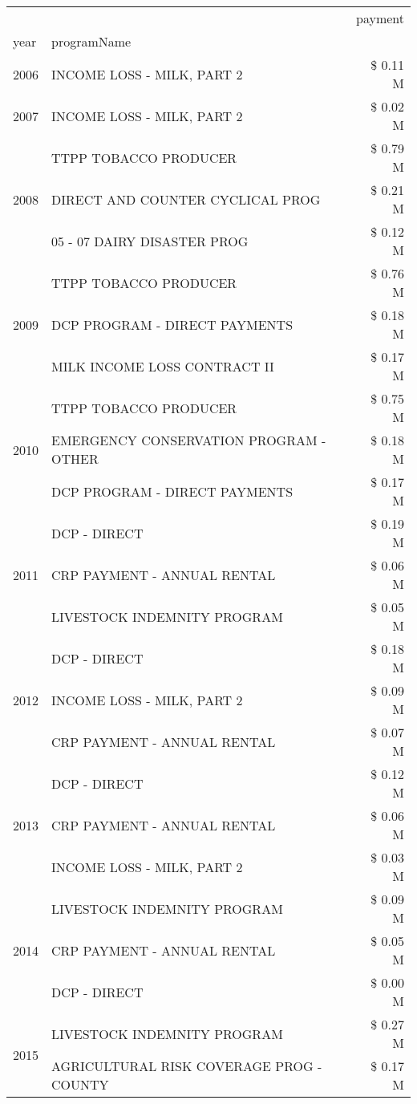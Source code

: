 \begin{tabular}{llr}
\toprule
 &  & payment \\
year & programName &  \\
\midrule
2006 & INCOME LOSS - MILK, PART 2 & \$ 0.11 M \\
\cline{1-3}
2007 & INCOME LOSS - MILK, PART 2 & \$ 0.02 M \\
\cline{1-3}
\multirow[t]{3}{*}{2008} & TTPP TOBACCO PRODUCER & \$ 0.79 M \\
 & DIRECT AND COUNTER CYCLICAL PROG & \$ 0.21 M \\
 & 05 - 07 DAIRY DISASTER PROG & \$ 0.12 M \\
\cline{1-3}
\multirow[t]{3}{*}{2009} & TTPP TOBACCO PRODUCER & \$ 0.76 M \\
 & DCP PROGRAM - DIRECT PAYMENTS & \$ 0.18 M \\
 & MILK INCOME LOSS CONTRACT II & \$ 0.17 M \\
\cline{1-3}
\multirow[t]{3}{*}{2010} & TTPP TOBACCO PRODUCER & \$ 0.75 M \\
 & EMERGENCY CONSERVATION PROGRAM - OTHER & \$ 0.18 M \\
 & DCP PROGRAM - DIRECT PAYMENTS & \$ 0.17 M \\
\cline{1-3}
\multirow[t]{3}{*}{2011} & DCP - DIRECT & \$ 0.19 M \\
 & CRP PAYMENT - ANNUAL RENTAL & \$ 0.06 M \\
 & LIVESTOCK INDEMNITY PROGRAM & \$ 0.05 M \\
\cline{1-3}
\multirow[t]{3}{*}{2012} & DCP - DIRECT & \$ 0.18 M \\
 & INCOME LOSS - MILK, PART 2 & \$ 0.09 M \\
 & CRP PAYMENT - ANNUAL RENTAL & \$ 0.07 M \\
\cline{1-3}
\multirow[t]{3}{*}{2013} & DCP - DIRECT & \$ 0.12 M \\
 & CRP PAYMENT - ANNUAL RENTAL & \$ 0.06 M \\
 & INCOME LOSS - MILK, PART 2 & \$ 0.03 M \\
\cline{1-3}
\multirow[t]{3}{*}{2014} & LIVESTOCK INDEMNITY PROGRAM & \$ 0.09 M \\
 & CRP PAYMENT - ANNUAL RENTAL & \$ 0.05 M \\
 & DCP - DIRECT & \$ 0.00 M \\
\cline{1-3}
\multirow[t]{3}{*}{2015} & LIVESTOCK INDEMNITY PROGRAM & \$ 0.27 M \\
 & AGRICULTURAL RISK COVERAGE PROG - COUNTY & \$ 0.17 M \\

\end{tabular}
